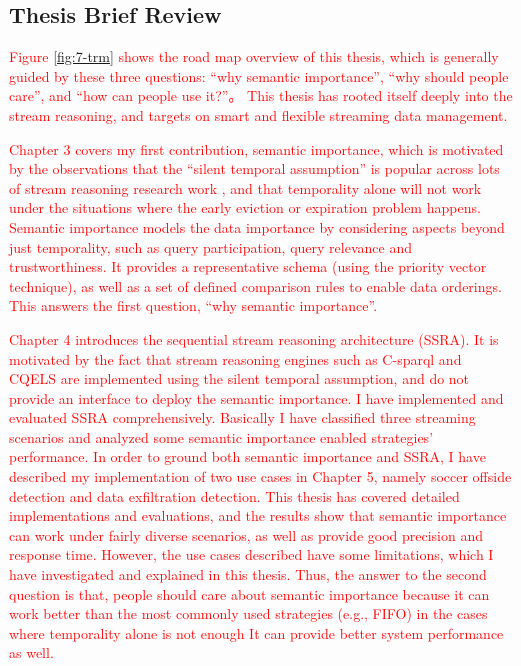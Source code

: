 \subsection{Thesis Brief Review}
\textcolor{red}{
Figure \ref{fig:7-trm} shows the road map overview of this thesis, which is generally guided by these three questions: 
``why semantic importance'', ``why should people care'', and ``how can people use it?''。
This thesis has rooted itself deeply into the stream reasoning, and targets on smart and flexible streaming data management. 
}

\textcolor{red}{
Chapter 3 covers my first contribution, semantic importance, which is motivated by the observations that the ``silent temporal assumption'' is popular across lots of stream reasoning research work \cite{barbieri2010stream} \cite{stuckenschmidt2010towards} \cite{golab2003processing} \cite{barbieri2010deductive}, and that temporality alone will not work under the situations where the early eviction or expiration problem happens. 
Semantic importance models the data importance by considering aspects beyond just temporality, such as query participation, query relevance and trustworthiness. 
It provides a representative schema (using the priority vector technique), as well as a set of defined comparison rules to enable data orderings. 
This answers the first question, ``why semantic importance''.
}

\textcolor{red}{
Chapter 4 introduces the sequential stream reasoning architecture (SSRA). 
It is motivated by the fact that stream reasoning engines such as C-sparql and CQELS are implemented using the silent temporal assumption, and do not provide an interface to deploy the semantic importance. 
I have implemented and evaluated SSRA comprehensively.
Basically I have classified three streaming scenarios and analyzed some semantic importance enabled strategies' performance. 
In order to ground both semantic importance and SSRA, I have described my implementation of two use cases in Chapter 5, namely soccer offside detection and data exfiltration detection.
This thesis has covered detailed implementations and evaluations, and the results show that semantic importance can work under fairly diverse scenarios, as well as provide good precision and response time. 
However, the use cases described have some limitations, which I have investigated and explained in this thesis. 
Thus, the answer to the second question is that, people should care about semantic importance because it can work better than the most commonly used strategies (e.g., FIFO) in the cases where temporality alone is not enough
It can provide better system performance as well. 
}

